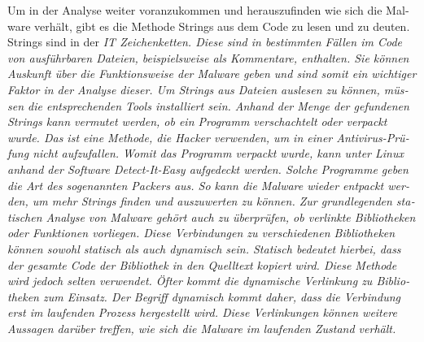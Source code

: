 \begin{otherlanguage}{ngerman}
Um in der Analyse weiter voranzukommen und herauszufinden wie sich die Malware verhält, gibt es die Methode Strings aus dem Code zu lesen und zu deuten. Strings sind in der \it IT \rm Zeichenketten. Diese sind in bestimmten Fällen im Code von ausführbaren Dateien, beispielsweise als Kommentare, enthalten. Sie können Auskunft über die Funktionsweise der Malware geben und sind somit ein wichtiger Faktor in der Analyse dieser. Um Strings aus Dateien auslesen zu können, müssen die entsprechenden Tools installiert sein. Anhand der Menge der gefundenen Strings kann vermutet werden, ob ein Programm verschachtelt oder verpackt wurde. Das ist eine Methode, die Hacker verwenden, um in einer Antivirus-Prüfung nicht aufzufallen. Womit das Programm verpackt wurde, kann unter Linux anhand der Software \dq Detect-It-Easy\dq{} aufgedeckt werden. Solche Programme geben die Art des sogenannten \dq Packers\dq{} aus. So kann die Malware wieder entpackt werden, um mehr Strings finden und auszuwerten zu können.
\newline 
Zur grundlegenden statischen Analyse von Malware gehört auch zu überprüfen, ob verlinkte Bibliotheken oder Funktionen vorliegen. Diese Verbindungen zu verschiedenen Bibliotheken können sowohl statisch als auch dynamisch sein. Statisch bedeutet hierbei, dass der gesamte Code der Bibliothek in den Quelltext kopiert wird. Diese Methode wird jedoch selten verwendet. Öfter kommt die dynamische Verlinkung zu Bibliotheken zum Einsatz. Der Begriff \dq dynamisch \dq{} kommt daher, dass die Verbindung erst im laufenden Prozess hergestellt wird. Diese Verlinkungen können weitere Aussagen darüber treffen, wie sich die Malware im laufenden Zustand verhält.

\end{otherlanguage}
